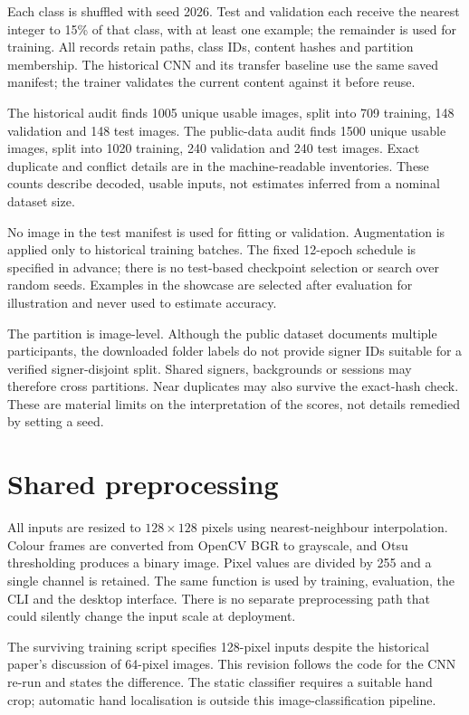 \documentclass[11pt,a4paper]{article}
\begin{document}
Each class is shuffled with seed 2026. Test and validation each receive the nearest integer to 15\% of that class, with at least one example; the remainder is used for training. All records retain paths, class IDs, content hashes and partition membership. The historical CNN and its transfer baseline use the same saved manifest; the trainer validates the current content against it before reuse.

The historical audit finds 1005 unique usable images, split into 709 training, 148 validation and 148 test images. The public-data audit finds 1500 unique usable images, split into 1020 training, 240 validation and 240 test images. Exact duplicate and conflict details are in the machine-readable inventories. These counts describe decoded, usable inputs, not estimates inferred from a nominal dataset size.

No image in the test manifest is used for fitting or validation. Augmentation is applied only to historical training batches. The fixed 12-epoch schedule is specified in advance; there is no test-based checkpoint selection or search over random seeds. Examples in the showcase are selected after evaluation for illustration and never used to estimate accuracy.

The partition is image-level. Although the public dataset documents multiple participants, the downloaded folder labels do not provide signer IDs suitable for a verified signer-disjoint split. Shared signers, backgrounds or sessions may therefore cross partitions. Near duplicates may also survive the exact-hash check. These are material limits on the interpretation of the scores, not details remedied by setting a seed.
\section{Shared preprocessing}
All inputs are resized to $128\times128$ pixels using nearest-neighbour interpolation. Colour frames are converted from OpenCV BGR to grayscale, and Otsu thresholding produces a binary image. Pixel values are divided by 255 and a single channel is retained. The same function is used by training, evaluation, the CLI and the desktop interface. There is no separate preprocessing path that could silently change the input scale at deployment.

The surviving training script specifies 128-pixel inputs despite the historical paper's discussion of 64-pixel images. This revision follows the code for the CNN re-run and states the difference. The static classifier requires a suitable hand crop; automatic hand localisation is outside this image-classification pipeline.
\end{document}
